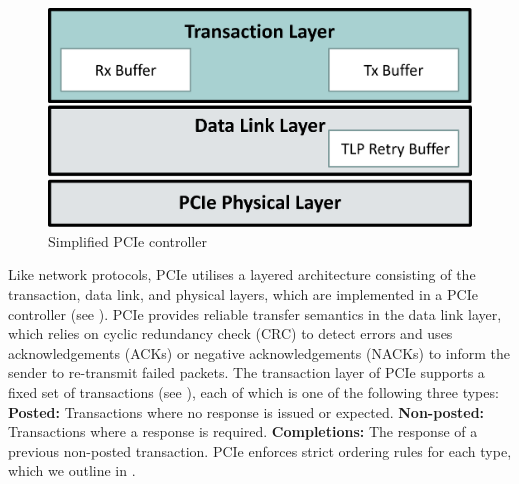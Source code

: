 \begin{figure}[!htb]
    \centering
    \includegraphics[width=\columnwidth]{figures/interconnect-sc/pcie-controller.png}
    \caption{Simplified PCIe controller}
    \label{fig:pcie-controller}
\end{figure}

Like network protocols, PCIe utilises a layered architecture consisting of the transaction, data link, and physical layers, which are implemented in a PCIe controller (see ).
PCIe provides reliable transfer semantics in the data link layer, which relies on cyclic redundancy check (CRC) to detect errors and uses acknowledgements (ACKs) or negative acknowledgements (NACKs) to inform the sender to re-transmit failed packets.
The transaction layer of PCIe supports a fixed set of transactions (see ), each of which is one of the following three types:
\textbf{Posted:} Transactions where no response is issued or expected. 
\textbf{Non-posted:} Transactions where a response is required. 
\textbf{Completions:} The response of a previous non-posted transaction.
PCIe enforces strict ordering rules for each type, which we outline in .

